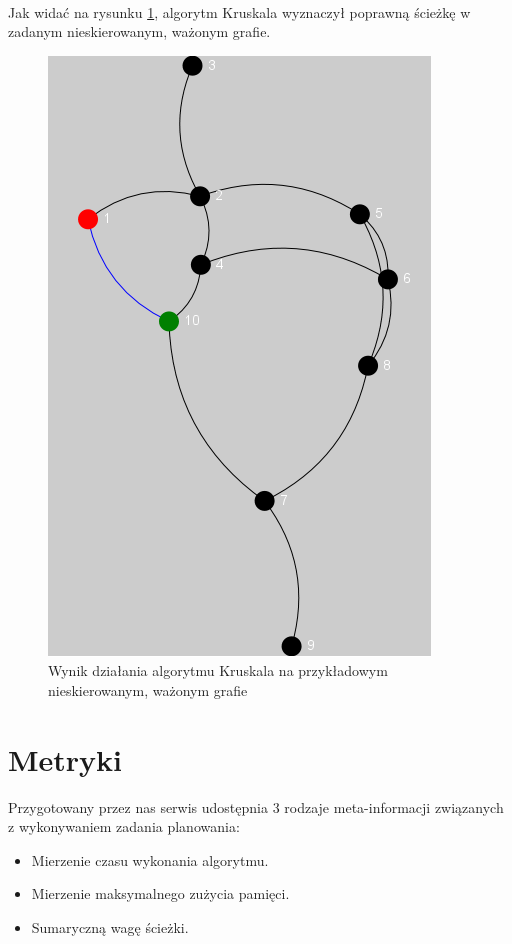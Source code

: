 \paragraph{}
Jak widać na rysunku \ref{fig:kruskal}, algorytm Kruskala wyznaczył poprawną ścieżkę w zadanym nieskierowanym, ważonym grafie.
\begin{figure}[!h]
 \centering
 \includegraphics{algorithms/kruskal}
 \caption{Wynik działania algorytmu Kruskala na przykładowym nieskierowanym, ważonym grafie}
 \label{fig:kruskal}
\end{figure}

\section{Metryki}

Przygotowany przez nas serwis udostępnia 3 rodzaje meta-informacji związanych z wykonywaniem zadania planowania:
\begin{itemize}
	\item Mierzenie czasu wykonania algorytmu.
	\item Mierzenie maksymalnego zużycia pamięci.
	\item Sumaryczną wagę ścieżki.
\end{itemize}

